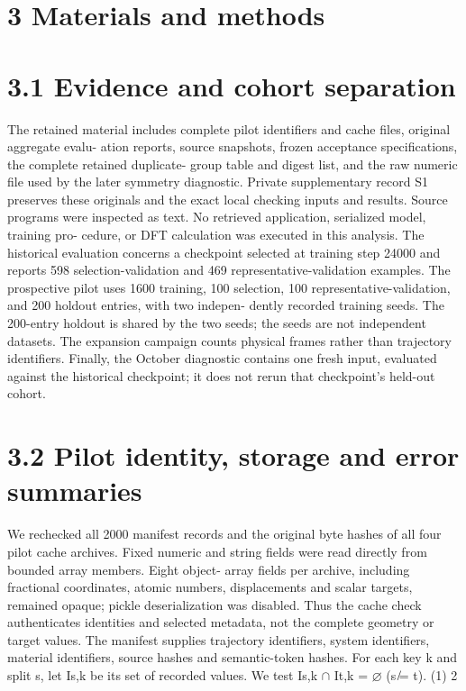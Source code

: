 \documentclass[11pt]{article}
\begin{document}
\section*{3 Materials and methods}


\section*{3.1 Evidence and cohort separation}

The retained material includes complete pilot identifiers and cache files, original aggregate evalu-
ation reports, source snapshots, frozen acceptance specifications, the complete retained duplicate-
group table and digest list, and the raw numeric file used by the later symmetry diagnostic. Private
supplementary record S1 preserves these originals and the exact local checking inputs and results.
Source programs were inspected as text. No retrieved application, serialized model, training pro-
cedure, or DFT calculation was executed in this analysis.
The historical evaluation concerns a checkpoint selected at training step 24000 and reports 598
selection-validation and 469 representative-validation examples. The prospective pilot uses 1600
training, 100 selection, 100 representative-validation, and 200 holdout entries, with two indepen-
dently recorded training seeds. The 200-entry holdout is shared by the two seeds; the seeds are
not independent datasets. The expansion campaign counts physical frames rather than trajectory
identifiers. Finally, the October diagnostic contains one fresh input, evaluated against the historical
checkpoint; it does not rerun that checkpoint’s held-out cohort.

\section*{3.2 Pilot identity, storage and error summaries}

We rechecked all 2000 manifest records and the original byte hashes of all four pilot cache archives.
Fixed numeric and string fields were read directly from bounded array members. Eight object-
array fields per archive, including fractional coordinates, atomic numbers, displacements and scalar
targets, remained opaque; pickle deserialization was disabled. Thus the cache check authenticates
identities and selected metadata, not the complete geometry or target values.
The manifest supplies trajectory identifiers, system identifiers, material identifiers, source hashes
and semantic-token hashes. For each key k and split s, let Is,k be its set of recorded values. We
test
Is,k \ensuremath{\cap} It,k = \ensuremath{\varnothing} (s ̸= t). (1)
2
\end{document}
